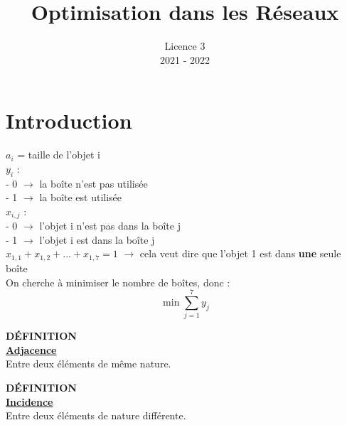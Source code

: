 \documentclass{article}
\title{Optimisation dans les Réseaux}
\author{}
\date{Licence 3\\2021 - 2022}
\begin{document}
\normalsize
\maketitle

\renewcommand*\contentsname{Table des matières}
\tableofcontents
\newpage
\section{Introduction}

\begin{figure}[H]
    \centering
\end{figure}

$a_i$ = taille de l'objet i
\\%
$y_i$ :
\\- 0 $\rightarrow$ la boîte n'est pas utilisée
\\- 1 $\rightarrow$ la boîte est utilisée
\\%
$x_{i, j}$ :
\\- 0 $\rightarrow$ l'objet i n'est pas dans la boîte j
\\- 1 $\rightarrow$ l'objet i est dans la boîte j
\\%
$x_{1, 1} + x_{1, 2} + ... + x_{1, 7} = 1$ $\rightarrow$ cela veut dire que l'objet 1 est dans \textbf{une} seule boîte
\\%
On cherche à minimiser le nombre de boîtes, donc :
$$\min \sum_{j=1}^{7} y_j$$
%
\begin{definition}
{ \scriptsize \textcolor{definition}{ \textbf{DÉFINITION}}}
\vspace{3px}
\\ \underline{\textbf{Adjacence}}
\vspace{2.5px}
\\ Entre deux éléments de même nature.
\end{definition}

\begin{definition}
{ \scriptsize \textcolor{definition}{ \textbf{DÉFINITION}}}
\vspace{3px}
\\ \underline{\textbf{Incidence}}
\vspace{2.5px}
\\ Entre deux éléments de nature différente.
\end{definition}
\end{document}
